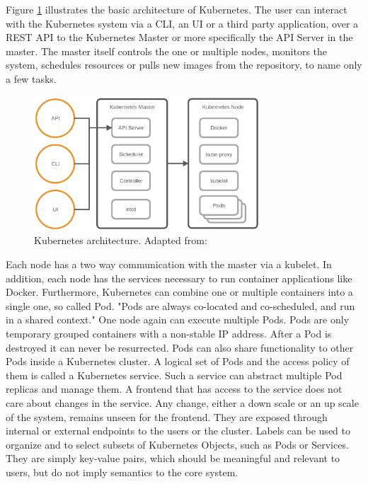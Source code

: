 Figure \ref{fig:kubernetes_architecture} illustrates the basic architecture of Kubernetes.
The user can interact with the Kubernetes system via a \ac{CLI}, an \ac{UI} or a third party application, over a \ac{REST} \ac{API} to the Kubernetes Master or more specifically the \ac{API} Server in the master.
The master itself controls the one or multiple nodes, monitors the system, schedules resources or pulls new images from the repository, to name only a few tasks.

\begin{figure}[H]
    \centering
    \includegraphics[width=0.75\textwidth]{resources/images/kubernetes_architecture.png}
    \caption[Kubernetes architecture]{Kubernetes architecture. Adapted from: \autocite[p. 4]{MSV:2016}}
    \label{fig:kubernetes_architecture}
\end{figure}

Each node has a two way communication with the master via a kubelet.
In addition, each node has the services necessary to run container applications like Docker.
Furthermore, Kubernetes can combine one or multiple containers into a single one, so called Pod.\autocite[cf.][p. 7]{Mulyana:2016}
"Pods are always co-located and co-scheduled, and run in a shared context."\autocite{Kubernetes:pods:2016}
One node again can execute multiple Pods.
Pods are only temporary grouped containers with a non-stable \ac{IP} address.
After a Pod is destroyed it can never be resurrected.
Pods can also share functionality to other Pods inside a Kubernetes cluster.
A logical set of Pods and the access policy of them is called a Kubernetes service.
Such a service can abstract multiple Pod replicas and manage them.
A frontend that has access to the service does not care about changes in the service.
Any change, either a down scale or an up scale of the system, remains unseen for the frontend.
They are exposed through internal or external endpoints to the users or the cluster.\autocite[cf.][p. 11]{MSV:2016}
Labels can be used to organize and to select subsets of Kubernetes Objects, such as Pods or Services.\autocite[cf.]{Kubernetes:labels:2016}
They are simply key-value pairs, which should be meaningful and relevant to users, but do not imply semantics to the core system.\autocite[cf.]{Kubernetes:labels:2016}

